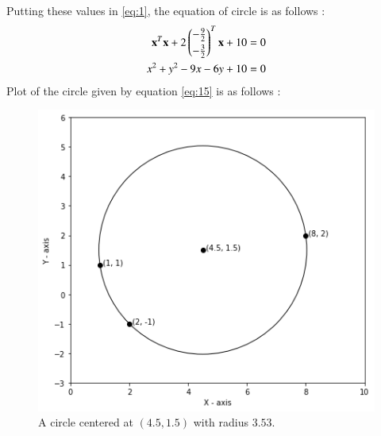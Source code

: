 \documentclass[journal,12pt,twocolumn]{IEEEtran}
\begin{document}
Putting these values in \eqref{eq:1}, the equation of circle is as follows : 
\begin{align}
\mathbf{x}^T\mathbf{x}+2\begin{pmatrix}-\frac{9}{2}\\[0.1cm]-\frac{3}{2}\end{pmatrix}^T\mathbf{x}+10&=0\label{eq:14}\\
x^2+y^2-9x-6y+10&=0\label{eq:15}
\end{align}
Plot of the circle given by equation \eqref{eq:15} is as follows :
\begin{figure}[h]
\centering
    \includegraphics[width=\columnwidth]{circle2.png}
    \caption{A circle centered at $(4.5, 1.5)$ with radius $3.53$.}
    \label{circle}
\end{figure}
\end{document}
